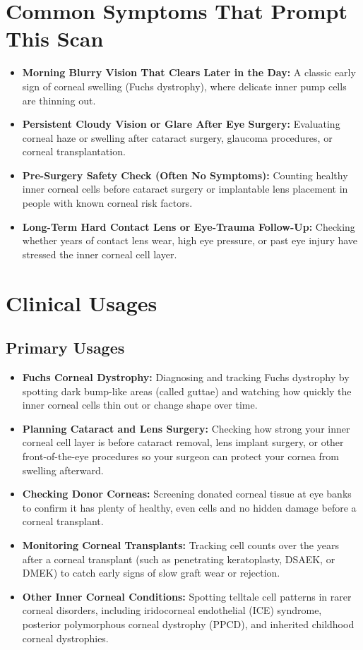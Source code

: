 \section{Common Symptoms That Prompt This Scan}
\begin{itemize}
    \item \textbf{Morning Blurry Vision That Clears Later in the Day:} A classic early sign of corneal swelling (Fuchs dystrophy), where delicate inner pump cells are thinning out.
    \item \textbf{Persistent Cloudy Vision or Glare After Eye Surgery:} Evaluating corneal haze or swelling after cataract surgery, glaucoma procedures, or corneal transplantation.
    \item \textbf{Pre-Surgery Safety Check (Often No Symptoms):} Counting healthy inner corneal cells before cataract surgery or implantable lens placement in people with known corneal risk factors.
    \item \textbf{Long-Term Hard Contact Lens or Eye-Trauma Follow-Up:} Checking whether years of contact lens wear, high eye pressure, or past eye injury have stressed the inner corneal cell layer.
\end{itemize}

\section{Clinical Usages}

\subsection{Primary Usages}

\begin{itemize}
    \item \textbf{Fuchs Corneal Dystrophy:} Diagnosing and tracking Fuchs dystrophy by spotting dark bump-like areas (called guttae) and watching how quickly the inner corneal cells thin out or change shape over time.
    \item \textbf{Planning Cataract and Lens Surgery:} Checking how strong your inner corneal cell layer is before cataract removal, lens implant surgery, or other front-of-the-eye procedures so your surgeon can protect your cornea from swelling afterward.
    \item \textbf{Checking Donor Corneas:} Screening donated corneal tissue at eye banks to confirm it has plenty of healthy, even cells and no hidden damage before a corneal transplant.
    \item \textbf{Monitoring Corneal Transplants:} Tracking cell counts over the years after a corneal transplant (such as penetrating keratoplasty, DSAEK, or DMEK) to catch early signs of slow graft wear or rejection.
    \item \textbf{Other Inner Corneal Conditions:} Spotting telltale cell patterns in rarer corneal disorders, including iridocorneal endothelial (ICE) syndrome, posterior polymorphous corneal dystrophy (PPCD), and inherited childhood corneal dystrophies.
\end{itemize}

